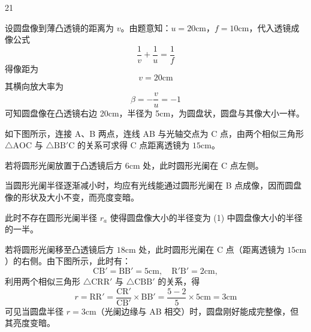\begin{solution}{21}
    \begin{subsolution}
        设圆盘像到薄凸透镜的距离为 $v$。由题意知：$u = 20\mathrm{cm}$，$f = 10\mathrm{cm}$，代入透镜成像公式
        \begin{equation}
            \frac{1}{v} + \frac{1}{u} = \frac{1}{f}
            \label{eq:1.s21}
        \end{equation}
        得像距为
        \begin{equation}
            v = 20\mathrm{cm}
            \label{eq:2.s21}
        \end{equation}
        其横向放大率为
        \begin{equation}
            \beta = -\frac{v}{u} = -1
            \label{eq:3.s21}
        \end{equation}
        可知圆盘像在凸透镜右边 20cm，半径为 5cm，为圆盘状，圆盘与其像大小一样。
    \end{subsolution}
    \begin{subsolution}
        如下图所示，连接 A、B 两点，连线 AB 与光轴交点为 C 点，由两个相似三角形 $\triangle\mathrm{AOC}$ 与 $\triangle\mathrm{BB'C}$ 的关系可求得 C 点距离透镜为 $15\mathrm{cm}$。

        若将圆形光阑放置于凸透镜后方 $6\mathrm{cm}$ 处，此时圆形光阑在 C 点左侧。

        当圆形光阑半径逐渐减小时，均应有光线能通过圆形光阑在 B 点成像，因而圆盘像的形状及大小不变，而亮度变暗。

        此时不存在圆形光阑半径 $r_a$ 使得圆盘像大小的半径变为 (1) 中圆盘像大小的半径的一半。
    \end{subsolution}
    \begin{subsolution}
        若将圆形光阑移至凸透镜后方 $18\mathrm{cm}$ 处，此时圆形光阑在 C 点（距离透镜为 $15\mathrm{cm}$）的右侧。由下图所示，此时有：
        \begin{equation*}
            \mathrm{CB'} = \mathrm{BB'} = 5\mathrm{cm}, \quad \mathrm{R'B'} = 2\mathrm{cm},
        \end{equation*}
        利用两个相似三角形 $\triangle\mathrm{CRR'}$ 与 $\triangle\mathrm{CBB'}$ 的关系，得
        \begin{equation}
            r = \mathrm{RR'} = \frac{\mathrm{CR'}}{\mathrm{CB'}} \times \mathrm{BB'} = \frac{5 - 2}{5} \times 5\mathrm{cm} = 3\mathrm{cm}
            \label{eq:4.s21}
        \end{equation}
        可见当圆盘半径 $r = 3\mathrm{cm}$（光阑边缘与 AB 相交）时，圆盘刚好能成完整像，但其亮度变暗。


\end{subsolution}
\end{solution}
